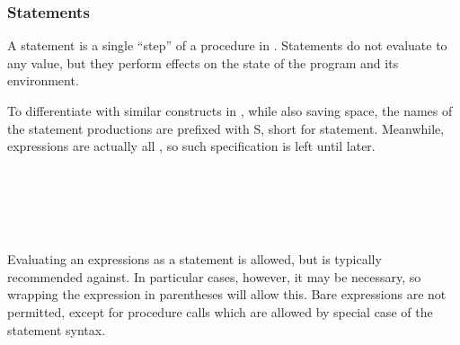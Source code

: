 \subsubsection{Statements}

A statement is a single ``step'' of a procedure in \Prose{}. Statements do not
evaluate to any value, but they perform effects on the state of the program and
its environment.

To differentiate with similar constructs in \Poetry{}, while also saving space,
the names of the statement productions are prefixed with S, short for statement.
Meanwhile, expressions are actually all \Poetry{}, so such specification is left
until later.

\begin{bnf*}
     \\
     \\
     \\
     \\
\end{bnf*}

Evaluating an expressions as a statement is allowed, but is typically
recommended against. In particular cases, however, it may be necessary,
so wrapping the expression in parentheses will allow this. Bare expressions
are not permitted, except for procedure calls which are allowed by special
case of the statement syntax.

\begin{prooftree}
\end{prooftree}


